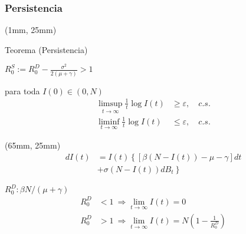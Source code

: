 \begin{frame}
    \frametitle{Persistencia}
        \begin{textblock*}{62mm}(1mm, 25mm)
            \begin{yellowbox}{Teorema (Persistencia)}
                \begin{list}{\bullet}{}
                    \item
                        $
                            \displaystyle
                            R_0 ^ S := R_0 ^D
                            - \frac{\sigma ^ 2}{2(\mu + \gamma)} > 1
                        $
                \end{list}
                \tcblower
                para toda $I(0)\in (0, N)$
                \begin{align*}
                    \limsup_{t \to \infty} 
                        \frac{1}{t} \log I(t)
                        &
                        \geq
                        \varepsilon,  \quad c.s.
                    \\
                    \liminf_{t \to \infty}
                        \frac{1}{t} \log I(t)
                        &
                        \leq
                        \varepsilon,  \quad c.s.
                \end{align*}
            \end{yellowbox}
        \end{textblock*}
        \begin{textblock*}{62mm}(65mm, 25mm)
            \begin{align*}
                dI(t) &= 
                    I(t)
                    \left\{
                        [
                            \beta (N - I(t))
                            -\mu - \gamma
                        ]
                        dt
                    \right.
                    \\
                     &+
                    \left.
                        \sigma (N-I(t))
                        dB_t
                    \right\}
                    \tag{\star}
            \end{align*}
           \begin{bluebox}{$R_0 ^ D: \beta N /(\mu + \gamma)$}
                \begin{align*}
                    R_0 ^ D & < 1
                    \ \Rightarrow
                        \lim_{t \to \infty}
                            I(t) = 0
                    \\
                    R_0 ^ D & > 1
                    \ \Rightarrow
                        \lim_{t \to \infty}
                            I(t) = 
                            N
                            \left(
                                1 -
                                \frac{1}{R_0 ^ D}
                            \right)
                \end{align*}
            \end{bluebox}
        \end{textblock*}
\end{frame}

